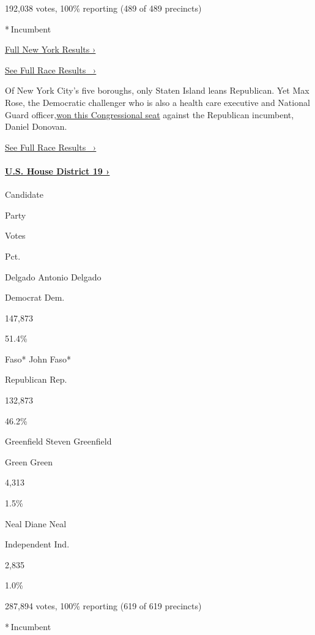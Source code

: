 192,038 votes, 100\% reporting (489 of 489 precincts)

* Incumbent

\href{https://www.nytimes3xbfgragh.onion/interactive/2018/11/06/us/elections/results-new-york-elections.html}{Full
New York Results ›}

\href{https://www.nytimes3xbfgragh.onion/elections/results/new-york-house-district-11}{See
Full Race Results~ ›}

Of New York City's five boroughs, only Staten Island leans Republican.
Yet Max Rose, the Democratic challenger who is also a health care
executive and National Guard
officer,\href{https://www.nytimes3xbfgragh.onion/2018/11/07/nyregion/senate-house-race.html}{won
this Congressional seat} against the Republican incumbent, Daniel
Donovan.

\href{https://www.nytimes3xbfgragh.onion/elections/results/new-york-house-district-11}{See
Full Race Results~ ›}

\hypertarget{us-house-district-19-}{%
\paragraph{\texorpdfstring{\href{https://www.nytimes3xbfgragh.onion/elections/results/new-york-house-district-19}{U.S.
House District 19
›}}{U.S. House District 19 ›}}\label{us-house-district-19-}}

Candidate

Party

Votes

Pct.

 Delgado Antonio Delgado

Democrat Dem.

147,873

51.4\%

 Faso* John Faso*

Republican Rep.

132,873

46.2\%

 Greenfield Steven Greenfield

Green Green

4,313

1.5\%

 Neal Diane Neal

Independent Ind.

2,835

1.0\%

287,894 votes, 100\% reporting (619 of 619 precincts)

* Incumbent

